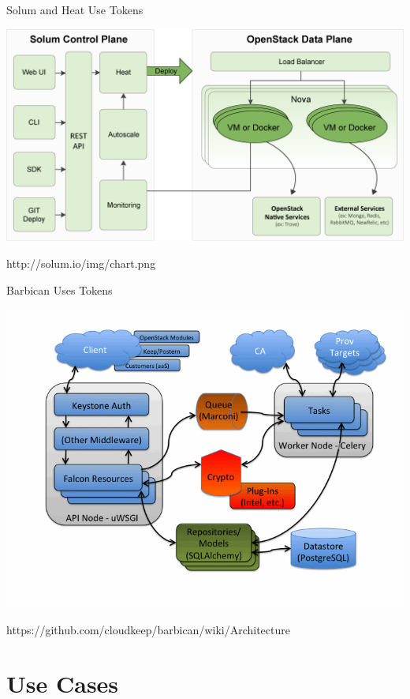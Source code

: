 \documentclass{beamer}
\begin{document}
\begin{frame}{Solum and Heat Use Tokens}
  \begin{block}{}
    \includegraphics[scale=0.3]{solum-arch.png}
  \end{block}
  http://solum.io/img/chart.png
\end {frame}

\begin{frame}{Barbican Uses Tokens}
  \begin{block}{}
    \includegraphics[scale=0.3]{barbican-arch.png}
  \end{block}
  https://github.com/cloudkeep/barbican/wiki/Architecture
\end {frame}



\section {Use Cases}
\end{document}
